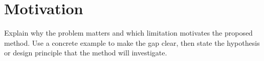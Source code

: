 \section{Motivation}
\label{sec:motivation}
Explain why the problem matters and which limitation motivates the proposed
method. Use a concrete example to make the gap clear, then state the
hypothesis or design principle that the method will investigate.
